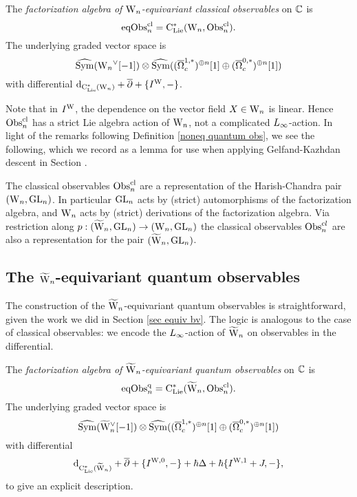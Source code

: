 \begin{dfn}
The \emph{factorization algebra of ${{\rm W}_n}$-equivariant classical observables} on $\mathbb C$ is
\[
{\rm eqObs}^{\rm cl}_n = {\rm C}_{\rm Lie}^*({{\rm W}_n}, {\rm Obs}^{\rm cl}_n).
\]
The underlying graded vector space is
\[
\widehat{{\rm Sym}}({{\rm W}_n}^\vee[-1]) \otimes \widehat{{\rm Sym}}((\overline{\Omega}^{1,*}_c)^{\oplus n}[1] \oplus (\overline{\Omega}^{0,*}_c)^{\oplus n}[1])
\]
with differential ${\rm d}_{{\rm C}_{\rm Lie}^*({{\rm W}_n})} + \overline{\partial} + \{I^{\rm W},-\}$.
\end{dfn}

Note that in $I^{\rm W}$, the dependence on the vector field $X \in {{\rm W}_n}$ is linear. 
Hence ${\rm Obs}^{\rm cl}_n$ has a strict Lie algebra action of ${{\rm W}_n}$, not a complicated $\L8$-action.
In light of the remarks following Definition \ref{noneq quantum obs}, we see the following,
which we record as a lemma for use when applying Gelfand-Kazhdan descent in Section \label{sec ss GK descent}.

\begin{lemma}
The classical observables ${\rm Obs}^{\rm cl}_n$ are a representation of the Harish-Chandra pair~$({{\rm W}_n},{\rm GL}_n)$.
In particular ${\rm GL}_n$ acts by (strict) automorphisms of the factorization algebra, and
${{\rm W}_n}$ acts by (strict) derivations of the factorization algebra. Via
restriction along $p : (\widetilde{{{\rm W}}}_n, {\rm GL}_n) \to ({{\rm W}_n}, {\rm GL}_n)$ the
classical observables ${\rm Obs}^{cl}_n$ are also a representation for the pair
$(\widetilde{{{\rm W}}}_n, {\rm GL}_n)$. 
\end{lemma}

\subsection{The $\widetilde{{{\rm W}}}_n$-equivariant quantum observables}

The construction of the $\widetilde{{{\rm W}}}_n$-equivariant quantum observables is straightforward,
given the work we did in Section \ref{sec equiv bv}.
The logic is analogous to the case of classical observables:
we encode the $\L8$-action of $\widetilde{{{\rm W}}}_n$ on observables in the differential.

\begin{dfn}
The \emph{factorization algebra of $\widetilde{{{\rm W}}}_n$-equivariant quantum observables} on $\mathbb C$ is
\[
{\rm eqObs}^{\rm q}_n = {\rm C}_{\rm Lie}^*(\widetilde{{{\rm W}}}_n, {\rm Obs}^{\rm cl}_n).
\]
The underlying graded vector space is
\[
\widehat{{\rm Sym}}(\widetilde{{{\rm W}}}_n^\vee[-1]) \otimes \widehat{{\rm Sym}}((\overline{\Omega}^{1,*}_c)^{\oplus n}[1] \oplus (\overline{\Omega}^{0,*}_c)^{\oplus n}[1])
\]
with differential 
\[
{\rm d}_{{\rm C}_{\rm Lie}^*(\widetilde{{{\rm W}}}_n)} + \overline{\partial} + \{I^{\rm W,0},-\} + \hbar \Delta + \hbar \{I^{\rm W,1}+J,-\},
\]
to give an explicit description.
\end{dfn}

